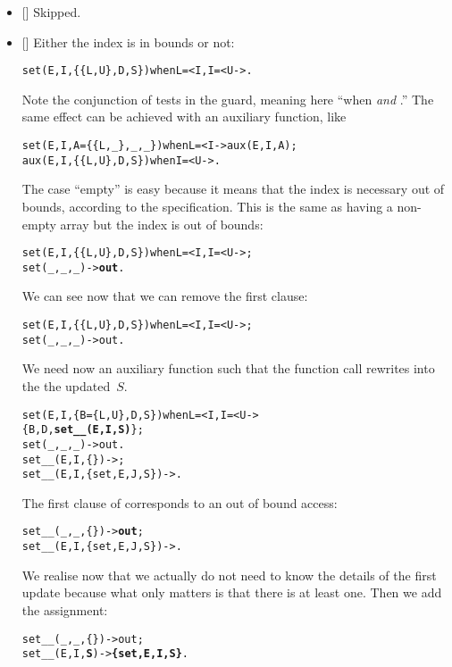 \begin{itemize}

  \item {[]} Skipped.

  \item {[]} Either the index is in bounds or not:
\begin{alltt}
set(E,I,\{\{L,U\},D,S\}) when L =< I,I =< U -> .
\end{alltt}
  Note the conjunction of tests in the guard, meaning here ``when
   \emph{and} .'' The same effect can
  be achieved with an auxiliary function, like
\begin{alltt}
set(E,I,A=\{\{L,_\},_,_\}) when L =< I -> aux(E,I,A);
aux(E,I,  \{\{L,U\},D,S\}) when I =< U -> .
\end{alltt}
  The case ``empty'' is easy because it means that the index is
  necessary out of bounds, according to the specification. This is the
  same as having a non\hyp{}empty array but the index is out of
  bounds:
\begin{alltt}
set(E,I,\{\{L,U\},D,S\}) when L =< I,I =< U -> ;
set(_,_,          _)                    -> \textbf{out}.
\end{alltt}
  We can see now that we can remove the first clause:
\begin{alltt}
set(E,I,\{\{L,U\},D,S\}) when L =< I,I =< U -> ;
set(_,_,          _)                    -> out.
\end{alltt}
  We need now an auxiliary function  such that the
  function call  rewrites into the
  the updated~\(S\).
\begin{alltt}
set(E,I,\{B=\{L,U\},D,S\}) when L =< I,I =< U ->
\hfill\{B,D,\textbf{set__(E,I,S)}\};
set(_,_,          _)                    -> out.
set__(E,I,         \{\})                  -> ;
set__(E,I,\{set,E,J,S\})                  -> .
\end{alltt}
  The first clause of  corresponds to an out of
  bound access:
\begin{alltt}
set__(_,_,         \{\})                  -> \textbf{out};
set__(E,I,\{set,E,J,S\})                  -> .
\end{alltt}
  We realise now that we actually do not need to know the details of
  the first update because what only matters is that there is at least
  one. Then we add the assignment:
\begin{alltt}
set__(_,_,\{\})                  -> out;
set__(E,I, \textbf{S})                  -> \textbf{\{set,E,I,S\}}.
\end{alltt}



\end{itemize}
